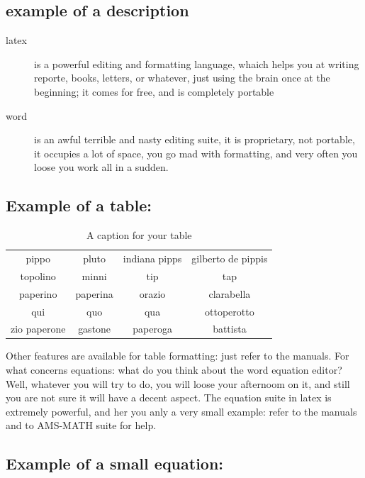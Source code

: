 \subsection{example of a description}
\begin{description}
\item[latex] is a powerful editing and formatting language, whaich helps you
at writing reporte, books, letters, or whatever, just using the brain 
once at the beginning; it comes for free, and is completely portable
\item[word] is an awful terrible and nasty editing suite, it is proprietary,
not portable, it occupies a lot of space, you go mad with formatting,
and very often you loose you work all in a sudden. 
\end{description}


\subsection{Example of a table:}

\begin{table}
\begin{center}
\begin{tabular}{|c|ccc|}
pippo & pluto & indiana pipps & gilberto de pippis \\
topolino & minni & tip & tap \\
paperino & paperina & orazio & clarabella \\
qui & quo & qua & ottoperotto \\
zio paperone & gastone & paperoga & battista \\  
\end{tabular}
\end{center}
\caption{A caption for your table}
\label{A-lable-for-your-table}
\end{table}


Other features are available for table formatting: just refer to the manuals.
For what concerns equations: what do you think about the word equation editor?
Well, whatever you will try to do, you will loose your afternoom on it, and
still you are not sure it will have a decent aspect. The equation suite
in latex is extremely powerful, and her you anly a very small example:
refer to the manuals and to AMS-MATH suite for help.


\subsection{Example of a small equation:}

